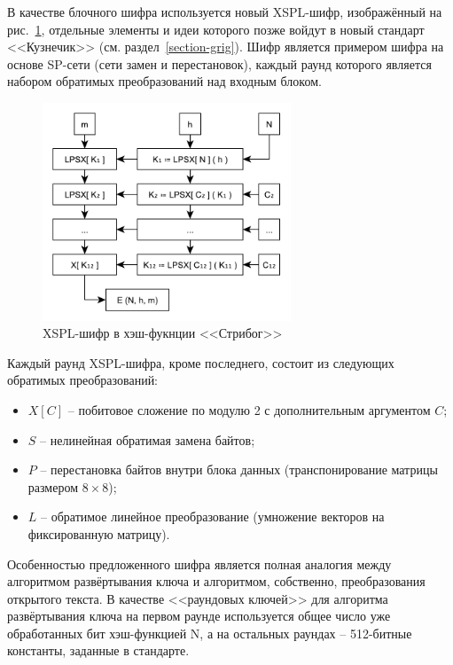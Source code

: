 В качестве блочного шифра используется новый XSPL-шифр, изображённый на рис.~\ref{fig:stribog-xspl}, отдельные элементы и идеи которого позже войдут в новый стандарт <<Кузнечик>> (см. раздел~\ref{section-grig}). Шифр является примером шифра на основе SP-сети (сети замен и перестановок), каждый раунд которого является набором обратимых преобразований над входным блоком.

\begin{figure}[htb]
	\centering
	\includegraphics[width=0.66\textwidth]{pic/stribog-xspl}
  \caption{XSPL-шифр в хэш-фукнции <<Стрибог>>}
  \label{fig:stribog-xspl}
\end{figure}

Каждый раунд XSPL-шифра, кроме последнего, состоит из следующих обратимых преобразований:
\begin{itemize}
	\item $X\left[C\right]$ -- побитовое сложение по модулю 2 с дополнительным аргументом $C$;
	\item $S$ -- нелинейная обратимая замена байтов;
	\item $P$ -- перестановка байтов внутри блока данных (транспонирование матрицы размером $8 \times 8$);
	\item $L$ -- обратимое линейное преобразование (умножение векторов на фиксированную матрицу).
\end{itemize}

Особенностью предложенного шифра является полная аналогия между алгоритмом развёртывания ключа и алгоритмом, собственно, преобразования открытого текста. В качестве <<раундовых ключей>> для алгоритма развёртывания ключа на первом раунде используется общее число уже обработанных бит хэш-функцией N, а на остальных раундах -- 512-битные константы, заданные в стандарте.

